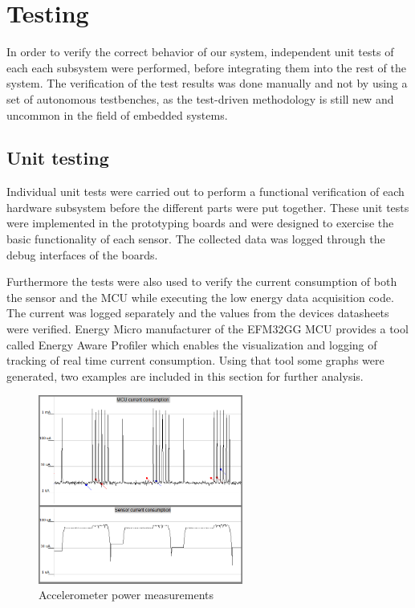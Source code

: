 \chapter{Testing}
In order to verify the correct behavior of our system, independent unit tests of each each subsystem were performed, before integrating them into the rest of the system. The verification of the test results was done manually and not by using a set of autonomous testbenches, as the test-driven methodology is still new and uncommon in the field of embedded systems.

\section{Unit testing}
Individual unit tests were carried out to perform a functional verification of each hardware subsystem before the different parts were put together. These unit tests were implemented in the prototyping boards and were designed to exercise the basic functionality of each sensor. The collected data was logged through the debug interfaces of the boards.

Furthermore the tests were also used to verify the current consumption of both the sensor and the MCU while executing the low energy data acquisition code. The current was logged separately and the values from the devices datasheets were verified. Energy Micro manufacturer of the EFM32GG MCU provides a tool called Energy Aware Profiler which enables the visualization and logging of tracking of real time current consumption. Using that tool some graphs were generated, two examples are included in this section for further analysis.

\begin{figure}
\centering
\includegraphics[width=0.6\textwidth]{Images/accel_merged}
\caption{Accelerometer power measurements}
\label{fig:accelerometer}
\end{figure}

